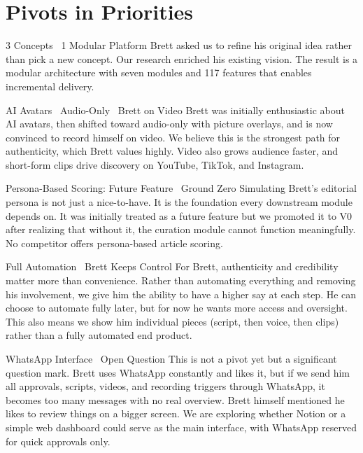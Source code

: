 \documentclass[11pt,a4paper]{article}
\begin{document}
\section{Pivots in Priorities}

\begin{pivotcard}{3 Concepts \textrightarrow\ 1 Modular Platform}
Brett asked us to refine his original idea rather than pick a new concept. Our research enriched his existing vision. The result is a modular architecture with seven modules and 117 features that enables incremental delivery.
\end{pivotcard}

\begin{pivotcard}{AI Avatars \textrightarrow\ Audio-Only \textrightarrow\ Brett on Video}
Brett was initially enthusiastic about AI avatars, then shifted toward audio-only with picture overlays, and is now convinced to record himself on video. We believe this is the strongest path for authenticity, which Brett values highly. Video also grows audience faster, and short-form clips drive discovery on YouTube, TikTok, and Instagram.
\end{pivotcard}

\begin{pivotcard}{Persona-Based Scoring: Future Feature \textrightarrow\ Ground Zero}
Simulating Brett's editorial persona is not just a nice-to-have. It is the foundation every downstream module depends on. It was initially treated as a future feature but we promoted it to V0 after realizing that without it, the curation module cannot function meaningfully. No competitor offers persona-based article scoring.
\end{pivotcard}

\begin{pivotcard}{Full Automation \textrightarrow\ Brett Keeps Control}
For Brett, authenticity and credibility matter more than convenience. Rather than automating everything and removing his involvement, we give him the ability to have a higher say at each step. He can choose to automate fully later, but for now he wants more access and oversight. This also means we show him individual pieces (script, then voice, then clips) rather than a fully automated end product.
\end{pivotcard}

\begin{pivotcard}{WhatsApp Interface \textrightarrow\ Open Question}
This is not a pivot yet but a significant question mark. Brett uses WhatsApp constantly and likes it, but if we send him all approvals, scripts, videos, and recording triggers through WhatsApp, it becomes too many messages with no real overview. Brett himself mentioned he likes to review things on a bigger screen. We are exploring whether Notion or a simple web dashboard could serve as the main interface, with WhatsApp reserved for quick approvals only.
\end{pivotcard}
\end{document}
